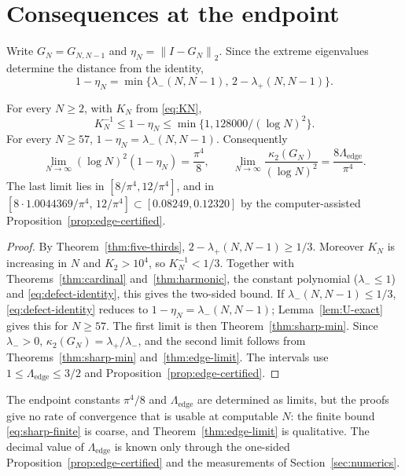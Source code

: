 \documentclass{siamart251216}
\newcommand{\norm}[1]{\left\lVert#1\right\rVert}
\begin{document}
\section{Consequences at the endpoint}\label{sec:consequences}

Write $G_N=G_{N,N-1}$ and $\eta_N=\norm{I-G_N}_2$. Since the extreme
eigenvalues determine the distance from the identity,
\begin{equation}\label{eq:defect-identity}
 1-\eta_N=\min\{\lambda_-(N,N-1),\,2-\lambda_+(N,N-1)\}.
\end{equation}

\begin{corollary}\label{cor:endpoint}%
For every $N\ge2$, with $K_N$ from \eqref{eq:KN},
\[
 K_N^{-1}\le1-\eta_N\le\min\{1,128000/(\log N)^2\}.
\]
For every $N\ge57$, $1-\eta_N=\lambda_-(N,N-1)$. Consequently
\[
 \lim_{N\to\infty}(\log N)^2(1-\eta_N)=\frac{\pi^4}8,\qquad
 \lim_{N\to\infty}\frac{\kappa_2(G_N)}{(\log N)^2}=\frac{8\Lambda_{\mathrm{edge}}}{\pi^4}.
\]
The last limit lies in $[8/\pi^4,12/\pi^4]$, and in
$[8\cdot1.0044369/\pi^4,\,12/\pi^4]\subset[0.08249,0.12320]$ by the
computer-assisted Proposition~\ref{prop:edge-certified}.
\end{corollary}

\begin{proof}
By Theorem~\ref{thm:five-thirds}, $2-\lambda_+(N,N-1)\ge1/3$. Moreover
$K_N$ is increasing in $N$ and $K_2>10^4$, so $K_N^{-1}<1/3$. Together with
Theorems~\ref{thm:cardinal} and~\ref{thm:harmonic}, the constant polynomial
($\lambda_-\le1$) and \eqref{eq:defect-identity}, this gives the two-sided
bound. If $\lambda_-(N,N-1)\le1/3$, \eqref{eq:defect-identity} reduces to
$1-\eta_N=\lambda_-(N,N-1)$; Lemma~\ref{lem:U-exact} gives this for
$N\ge57$. The first limit is then Theorem~\ref{thm:sharp-min}. Since
$\lambda_->0$, $\kappa_2(G_N)=\lambda_+/\lambda_-$, and the second limit follows
from Theorems~\ref{thm:sharp-min} and~\ref{thm:edge-limit}. The intervals use
$1\le\Lambda_{\mathrm{edge}}\le3/2$ and Proposition~\ref{prop:edge-certified}.
\end{proof}

\begin{remark}\label{rem:rate}
The endpoint constants $\pi^4/8$ and $\Lambda_{\mathrm{edge}}$ are determined
as limits, but the proofs give no rate of convergence that is usable at
computable $N$: the finite bound \eqref{eq:sharp-finite} is coarse, and
Theorem~\ref{thm:edge-limit} is qualitative. The decimal value of
$\Lambda_{\mathrm{edge}}$ is known only through the one-sided
Proposition~\ref{prop:edge-certified} and the measurements of
Section~\ref{sec:numerics}.
\end{remark}
\end{document}
